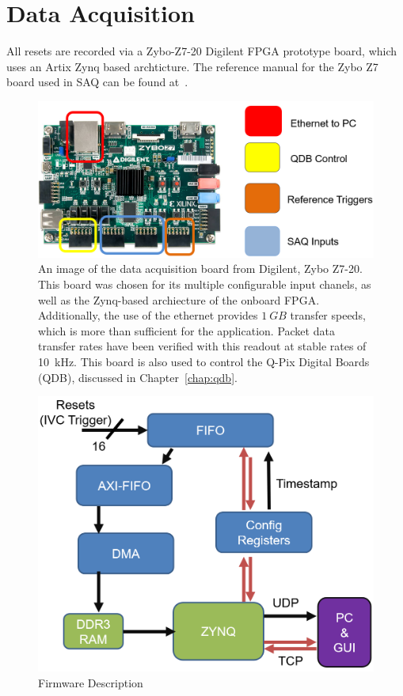 \section{Data Acquisition}

All resets are recorded via a Zybo-Z7-20 Digilent FPGA prototype board, which uses an Artix Zynq based archticture.
The reference manual for the Zybo Z7 board used in SAQ can be found at~\citep{zybo_zy_reference}.

\begin{figure}[]
\centering
\includegraphics[width=\textwidth]{images/saq_zybo_io_summary.png}
\caption{An image of the data acquisition board from Digilent, Zybo Z7-20. 
This board was chosen for its multiple configurable input chanels, as well as the Zynq-based archiecture of the onboard FPGA.
Additionally, the use of the ethernet provides $1~\unit{GB}$ transfer speeds, which is more than sufficient for the application.
Packet data transfer rates have been verified with this readout at stable rates of 10~\unit{kHz}.
This board is also used to control the Q-Pix Digital Boards (QDB), discussed in Chapter~\ref{chap:qdb}.
}
\label{fig:saq_zybo}
\end{figure}

\begin{figure}[]
\centering
\includegraphics[width=\textwidth]{images/saq_daq_firmware_summary.png}
\caption{Firmware Description}
\label{fig:saq_firmware}
\end{figure}

